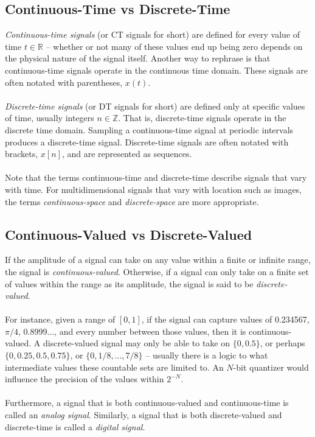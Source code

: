 \documentclass{report}
\begin{document}
\subsection{Continuous-Time vs Discrete-Time}
\emph{Continuous-time signals} (or CT signals for short) are defined for every value of time $t\in\mathbb{R}$ -- whether or not many of these values end up being zero depends on the physical nature of the 
signal itself. Another way to rephrase is that continuous-time signals operate in the continuous time domain. These signals are often notated with parentheses, $x(t)$.
\\ \\
\emph{Discrete-time signals} (or DT signals for short) are defined only at specific values of time, usually integers $n\in\mathbb{Z}$. That is, discrete-time signals operate in the discrete time domain. 
Sampling a continuous-time signal at periodic intervals produces a discrete-time signal. Discrete-time signals are often notated with brackets, $x[n]$, and are represented as sequences.
\\ \\ 
Note that the terms continuous-time and discrete-time describe signals that vary with time. For multidimensional signals that vary with location such as images, the terms \emph{continuous-space} and \emph{discrete-space} 
are more appropriate.

\subsection{Continuous-Valued vs Discrete-Valued}
If the amplitude of a signal can take on any value within a finite or infinite range, the signal is \emph{continuous-valued}. Otherwise, if a signal can only take on a finite set of values 
within the range as its amplitude, the signal is said to be \emph{discrete-valued}. 
\\ \\
For instance, given a range of $[0,1]$, if the signal can capture values of 0.234567, $\pi/4$, 0.8999..., and every number between those values, then it is continuous-valued. A discrete-valued signal may only 
be able to take on $\{0,0.5\}$, or perhaps $\{0,0.25,0.5,0.75\}$, or $\{0, 1/8, ..., 7/8\}$ -- usually there is a logic to what intermediate values these countable sets are limited to. An $N$-bit quantizer would influence 
the precision of the values within $2^{-N}$.
\\ \\
Furthermore, a signal that is both continuous-valued and continuous-time is called an \emph{analog signal}. Similarly, a signal that is both discrete-valued and discrete-time is called 
a \emph{digital signal}.
\end{document}
